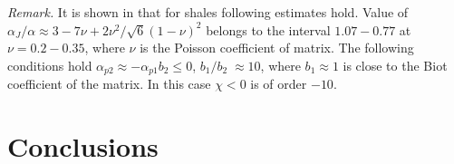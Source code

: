 \documentclass[article,authoryear,jpm]{beg_39}             %
\begin{document}
\textit{Remark.} It is shown in \cite{Izvekov2020} that for shales following estimates hold. Value of ${{{\alpha }_{J}}}/{\alpha }\approx {3-7\nu +2{{\nu }^{2}}}/{\sqrt{6}{{\left( 1-\nu  \right)}^{2}}}$ belongs to the interval $1.07 -0.77$ at $\nu =0.2-0.35$, where $\nu$ is the Poisson coefficient of matrix. The following conditions hold ${{\alpha }_{p2}}\approx -{{\alpha }_{p1}}{{b}_{2}}\le 0$, ${{{b}_{1}}}/{{{b}_{2}}}\;\approx 10$, where ${{b}_{1}}\approx 1$ is close to the Biot coefficient of the matrix. In this case $\chi <0$ is of order $-10$.

\section{Conclusions}
\end{document}
